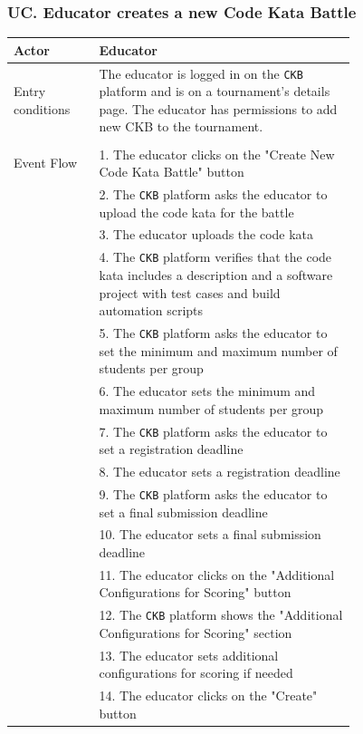 \subsubsection*{UC\cuc . Educator creates a new Code Kata Battle}
\begin{center}
    \begin{longtable}{lp{0.75\linewidth}}
        \hline
        Actor            & Educator \\
        \hline
        Entry conditions & The educator is logged in on the \verb|CKB| platform and is on a tournament's details page. The educator has permissions to add new CKB to the tournament.\\                                                                                                               \\
        \hline
        Event Flow      
        & 1. The educator clicks on the "Create New Code Kata Battle" button\\ 
        & 2. The \verb|CKB| platform asks the educator to upload the code kata for the battle\\
        & 3. The educator uploads the code kata\\
        & 4. The \verb|CKB| platform verifies that the code kata includes a description and a software project with test cases and build automation scripts\\
        & 5. The \verb|CKB| platform asks the educator to set the minimum and maximum number of students per group\\
        & 6. The educator sets the minimum and maximum number of students per group\\
        & 7. The \verb|CKB| platform asks the educator to set a registration deadline\\
        & 8. The educator sets a registration deadline\\
        & 9. The \verb|CKB| platform asks the educator to set a final submission deadline\\
        & 10. The educator sets a final submission deadline\\
        & 11. The educator clicks on the "Additional Configurations for Scoring" button\\
        & 12. The \verb|CKB| platform shows the "Additional Configurations for Scoring" section\\
        & 13. The educator sets additional configurations for scoring if needed\\
        & 14. The educator clicks on the "Create" button\\

\end{longtable}
\end{center}

